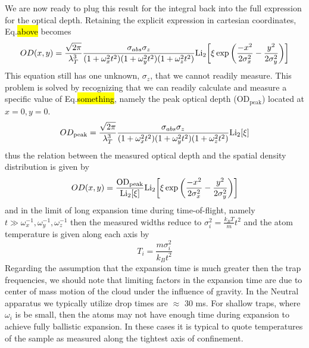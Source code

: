 We are now ready to plug this result for the integral back into the full expression for the optical depth. Retaining the explicit expression in cartesian coordinates, Eq.\hl{above} becomes
\begin{equation}
OD(x,y) = \frac{\sqrt{2\pi}}{\lambda_T^3}\frac{\sigma_{abs} \sigma_z}{(1+\omega_x^2t^2)(1+\omega_y^2t^2)(1+\omega_z^2t^2)} \text{Li}_{2}\!\left[ \xi\,\text{exp}\left( {\frac{-x^2}{2\sigma_x^2} - \frac{y^2}{2\sigma_y^2}} \right) \right]
\end{equation}
This equation still has one unknown, $\sigma_z$, that we cannot readily measure. This problem is solved by recognizing that we can readily calculate and measure a specific value of Eq.\hl{something}, namely the peak optical depth (OD$_\text{peak}$) located at $x=0,y=0$.
\begin{equation}
OD_{\text{peak}} = \frac{\sqrt{2\pi}}{\lambda_T^3}\frac{\sigma_{abs} \sigma_z}{(1+\omega_x^2t^2)(1+\omega_y^2t^2)(1+\omega_z^2t^2)} \text{Li}_{2}\!\left[ \xi \right]
\end{equation}
thus the relation between the measured optical depth and the spatial density distribution is given by
\begin{equation}
OD(x,y) = \frac{\text{OD}_{\text{peak}}}{\text{Li}_{2}\!\left[ \xi \right]}\text{Li}_{2}\!\left[ \xi\,\text{exp}\left( {\frac{-x^2}{2\sigma_x^2} - \frac{y^2}{2\sigma_y^2}} \right) \right]
\end{equation}
and in the limit of long expansion time during time-of-flight, namely $t \gg \omega_x^{-1}, \omega_y^{-1}, \omega_z^{-1}$ then the measured widths reduce to $\sigma_i^2=\frac{k_BT}{m}t^2$ and the atom temperature is given along each axis by
\begin{equation}
T_i=\frac{m \sigma_i^2}{k_Bt^2}
\end{equation}
Regarding the assumption that the expansion time is much greater then the trap frequencies, we should note that limiting factors in the expansion time are due to center of mass motion of the cloud under the influence of gravity. In the Neutral apparatus we typically utilize drop times are $\approx$ 30 ms. For shallow traps, where $\omega_i$ is be small, then the atoms may not have enough time during expansion to achieve fully ballistic expansion. In these cases it is typical to quote temperatures of the sample as measured along the tightest axis of confinement.


